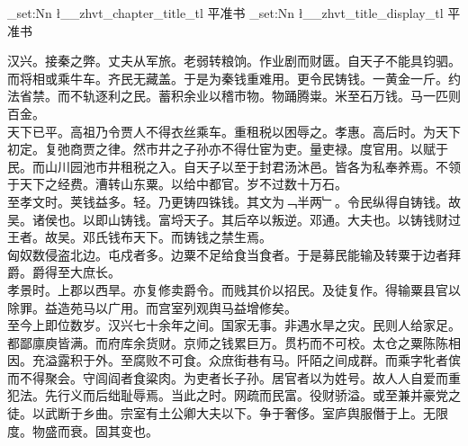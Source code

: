 \documentclass{zhvt-classic}
\begin{document}
\clearpage
\ExplSyntaxOn
\tl_set:Nn \l__zhvt_chapter_title_tl { 平准书 }
\tl_set:Nn \l__zhvt_title_display_tl { 平准书 }
\ExplSyntaxOff
\maketitle






\hspace*{2em}汉兴。接秦之弊。丈夫从军旅。老弱转粮饷。作业剧而财匮。自天子不能具钧驷。而将相或乘牛车。齐民无藏盖。于是为秦钱重难用。更令民铸钱。一黄金一斤。约法省禁。而不轨逐利之民。蓄积余业以稽市物。物踊腾粜。米至石万钱。马一匹则百金。\\
\hspace*{2em}天下已平。高祖乃令贾人不得衣丝乘车。重租税以困辱之。孝惠。高后时。为天下初定。复弛商贾之律。然市井之子孙亦不得仕宦为吏。量吏禄。度官用。以赋于民。而山川园池市井租税之入。自天子以至于封君汤沐邑。皆各为私奉养焉。不领于天下之经费。漕转山东粟。以给中都官。岁不过数十万石。\\
\hspace*{2em}至孝文时。荚钱益多。轻。乃更铸四铢钱。其文为﹁半两﹂。令民纵得自铸钱。故吴。诸侯也。以即山铸钱。富埒天子。其后卒以叛逆。邓通。大夫也。以铸钱财过王者。故吴。邓氏钱布天下。而铸钱之禁生焉。\\
\hspace*{2em}匈奴数侵盗北边。屯戍者多。边粟不足给食当食者。于是募民能输及转粟于边者拜爵。爵得至大庶长。\\
\hspace*{2em}孝景时。上郡以西旱。亦复修卖爵令。而贱其价以招民。及徒复作。得输粟县官以除罪。益造苑马以广用。而宫室列观舆马益增修矣。\\
\hspace*{2em}至今上即位数岁。汉兴七十余年之间。国家无事。非遇水旱之灾。民则人给家足。都鄙廪庾皆满。而府库余货财。京师之钱累巨万。贯朽而不可校。太仓之粟陈陈相因。充溢露积于外。至腐败不可食。众庶街巷有马。阡陌之间成群。而乘字牝者傧而不得聚会。守闾阎者食粱肉。为吏者长子孙。居官者以为姓号。故人人自爱而重犯法。先行义而后绌耻辱焉。当此之时。网疏而民富。役财骄溢。或至兼并豪党之徒。以武断于乡曲。宗室有土公卿大夫以下。争于奢侈。室庐舆服僭于上。无限度。物盛而衰。固其变也。\\
\end{document}
